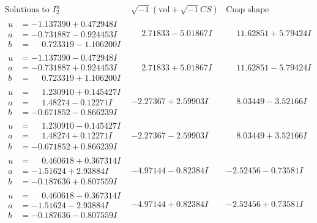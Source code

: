 \documentclass[1p]{elsarticle_modified}
\theoremstyle{definition}
\newcommand{\I}{\sqrt{-1}}
\begin{document}
$$\begin{array}{c|c|c}  
\text{Solutions to }I^u_{2}& \I (\text{vol} + \sqrt{-1}CS) & \text{Cusp shape}\\
 \hline 
\begin{aligned}
u &= -1.137390 + 0.472948 I \\
a &= -0.731887 - 0.924453 I \\
b &= \phantom{-}0.723319 - 1.106200 I\end{aligned}
 & \phantom{-}2.71833 - 5.01867 I & \phantom{-}11.62851 + 5.79424 I \\ \hline\begin{aligned}
u &= -1.137390 - 0.472948 I \\
a &= -0.731887 + 0.924453 I \\
b &= \phantom{-}0.723319 + 1.106200 I\end{aligned}
 & \phantom{-}2.71833 + 5.01867 I & \phantom{-}11.62851 - 5.79424 I \\ \hline\begin{aligned}
u &= \phantom{-}1.230910 + 0.145427 I \\
a &= \phantom{-}1.48274 - 0.12271 I \\
b &= -0.671852 - 0.866239 I\end{aligned}
 & -2.27367 + 2.59903 I & \phantom{-}8.03449 - 3.52166 I \\ \hline\begin{aligned}
u &= \phantom{-}1.230910 - 0.145427 I \\
a &= \phantom{-}1.48274 + 0.12271 I \\
b &= -0.671852 + 0.866239 I\end{aligned}
 & -2.27367 - 2.59903 I & \phantom{-}8.03449 + 3.52166 I \\ \hline\begin{aligned}
u &= \phantom{-}0.460618 + 0.367314 I \\
a &= -1.51624 + 2.93884 I \\
b &= -0.187636 + 0.807559 I\end{aligned}
 & -4.97144 - 0.82384 I & -2.52456 - 0.73581 I \\ \hline\begin{aligned}
u &= \phantom{-}0.460618 - 0.367314 I \\
a &= -1.51624 - 2.93884 I \\
b &= -0.187636 - 0.807559 I\end{aligned}
 & -4.97144 + 0.82384 I & -2.52456 + 0.73581 I \\ \hline\begin{aligned}

\end{aligned}
\end{array}$$
\end{document}
